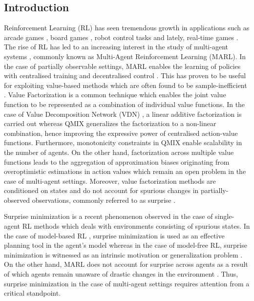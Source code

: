 \documentclass{article}
\begin{document}
\begin{multicols}{2}
\section{Introduction}
Reinforcement Learning (RL) has seen tremendous growth in applications such as arcade games \cite{atari}, board games \cite{go, shogi}, robot control tasks \cite{ddpg, ppo} and lately, real-time games \cite{SC2}. The rise of RL has led to an increasing interest in the study of multi-agent systems \cite{maddpg, alphastar}, commonly known as Multi-Agent Reinforcement Learning (MARL). In the case of partially observable settings, MARL enables the learning of policies with centralised training and decentralised control \cite{dec}. This has proven to be useful for exploiting value-based methods which are often found to be sample-inefficient \cite{iql,coma}. Value Factorization \cite{vdn,qmix} is a common technique which enables the joint value function to be represented as a combination of individual value functions. In the case of Value Decomposition Network (VDN) \cite{vdn}, a linear additive factorization is carried out whereas QMIX \cite{qmix} generalizes the factorization to a non-linear combination, hence improving the expressive power of centralised action-value functions. Furthermore, monotonicity constraints in QMIX enable scalability in the number of agents. On the other hand, factorization across multiple value functions leads to the aggregation of approximation biases \cite{doubleqlearning, deepdoubleqlearning} originating from overoptimistic estimations in action values \cite{td3,maxmin} which remain an open problem in the case of multi-agent settings. Moreover, value factorization methods are conditioned on states and do not account for spurious changes in partially-observed observations, commonly referred to as surprise \cite{surprise}. 

Surprise minimization \cite{smirl} is a recent phenomenon observed in the case of single-agent RL methods which deals with environments consisting of spurious states. In the case of model-based RL \cite{mbrl}, surprise minimization is used as an effective planning tool in the agent's model \cite{smirl} whereas in the case of model-free RL, surprise minimization is witnessed as an intrinsic motivation \cite{surprise,surpmodeling} or generalization problem \cite{gen}. On the other hand, MARL does not account for surprise across agents as a result of which agents remain unaware of drastic changes in the environment \cite{role}. Thus, surprise minimization in the case of multi-agent settings requires attention from a critical standpoint.


\end{multicols}
\end{document}
